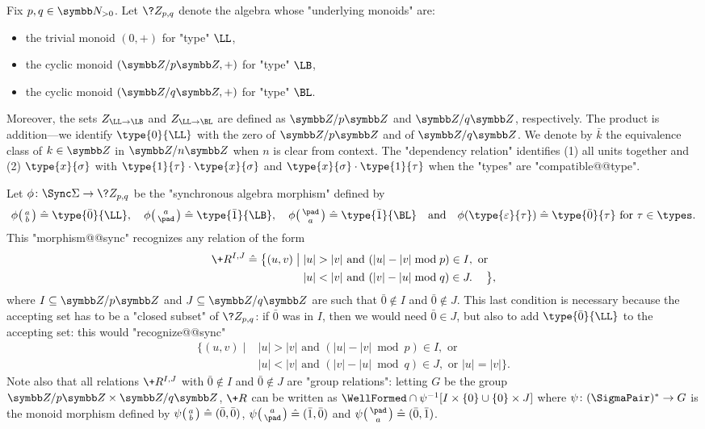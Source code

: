 \begin{example}
	\AP\label{ex:algebra-Zpq}
	Fix $p,q \in \N_{>0}$. Let $\?Z_{p,q}$ denote the algebra whose "underlying monoids" are:
	\begin{itemize}
		\item the trivial monoid $(0,+)$ for "type" $\LL$,
		\item the cyclic monoid $(\Z/p\Z,+)$ for "type" $\LB$,
		\item the cyclic monoid $(\Z/q\Z,+)$ for "type" $\BL$.
	\end{itemize}
	Moreover, the sets $Z_{\LL\to\LB}$ and $Z_{\LL\to\BL}$ are defined
	as $\Z/p\Z$ and $\Z/q\Z$, respectively.
	The product is addition---we identify $\type{0}{\LL}$ with the zero of $\Z/p\Z$ and
	of $\Z/q\Z$. We denote by $\bar k$ the equivalence class of $k\in \Z$ in
	$\Z/n\Z$ when $n$ is clear from context.
	The "dependency relation" identifies (1) all units together and (2) $\type{x}{\sigma}$ with $\type{1}{\tau} \cdot \type{x}{\sigma}$ and $\type{x}{\sigma} \cdot \type{1}{\tau}$ when the "types" are "compatible@@type".
	
	Let $\phi\colon \Sync\Sigma \to \?Z_{p,q}$ be the "synchronous algebra morphism"
	defined by
	\[
		\phi \pair{a}{b} \defeq  \type{\bar 0}{\LL}, 
		\quad
		\phi \pair{a}{\pad} \defeq \type{\bar 1}{\LB},
		\quad
		\phi \pair{\pad}{a} \defeq \type{\bar 1}{\BL}
		\quad\text{and}\quad
		\phi(\type{\varepsilon}{\tau}) \defeq \type{\bar 0}{\tau}
		\text{ for $\tau \in \types$}.
	\]
	This "morphism@@sync" recognizes any relation of the form 
	\begin{align*}
		\+R^{I,J} \defeq \big\{
			(u,v) \;\big\vert\; & |u| > |v| \text{ and } (|u| - |v| \bmod{p}) \in I, \text{ or} \\
			& |u| < |v| \text{ and } (|v| - |u| \bmod{q}) \in J.
		\hphantom{\text{ or}}\big\},
	\end{align*}
	where $I \subseteq \Z/p\Z$ and $J \subseteq \Z/q\Z$ are such that $\bar 0 \not\in I$
	and $\bar 0 \not\in J$. This last condition is necessary because the accepting set
	has to be a "closed subset" of $\?Z_{p,q}$: if $\bar 0$ was in $I$, then we would need
	$\bar 0 \in J$, but also to add $\type{\bar 0}{\LL}$ to the accepting set: this would "recognize@@sync"
	\begin{align*}
		\big\{
			(u,v) \;\big\vert\; & |u| > |v| \text{ and } (|u| - |v| \bmod{p}) \in I, \text{ or} \\
			& |u| < |v| \text{ and } (|v| - |u| \bmod{q}) \in J, \text{ or } |u| = |v| \big\}.
	\end{align*}
	Note also that all relations $\+R^{I,J}$ with $\bar 0 \not\in I$
	and $\bar 0 \not\in J$ are "group relations": letting $G$ be the group $\Z/p\Z \times \Z/q\Z$,
	$\+R$ can be written as $\WellFormed\cap \psi^{-1}[I \times \{0\} \cup \{0\} \times J]$ where $\psi \colon (\SigmaPair)^* \to G$ is the monoid morphism defined by $\psi\pair{a}{b} \defeq 
	(\bar 0, \bar 0)$, $\psi\pair{a}{\pad} \defeq (\bar 1, \bar 0)$ and $\psi\pair{\pad}{a} \defeq
	(\bar 0, \bar 1)$.
\end{example}


